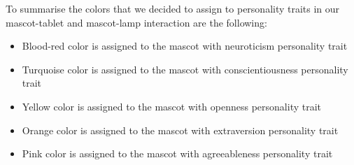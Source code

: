 To summarise the colors that we decided to assign to personality traits in our
mascot-tablet and mascot-lamp interaction are the following:
\begin{itemize}
\item Blood-red color is assigned to the mascot with neuroticism personality trait
\item Turquoise color is assigned to the mascot with conscientiousness personality trait
\item Yellow color is assigned to the mascot with openness personality trait
\item Orange color is assigned to the mascot with extraversion personality trait
\item Pink color is assigned to the mascot with agreeableness personality trait
\end{itemize}